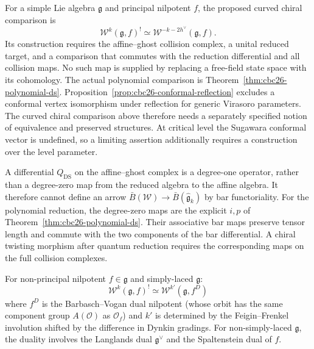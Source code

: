 

\begingroup
\providecommand{\Res}{\operatorname{Res}}
\providecommand{\Vir}{\operatorname{Vir}}
\providecommand{\Aut}{\operatorname{Aut}}

\endgroup




\begin{remark}
\label{thm:w-algebra-koszul-main}
\label{eq:w-koszul-main}\label{eq:ff-level-shift}
For a simple Lie algebra $\mathfrak g$ and principal nilpotent $f$, the proposed curved chiral comparison is
\[
 \mathcal W^k(\mathfrak g,f)^!\simeq\mathcal W^{-k-2h^\vee}(\mathfrak g,f).
\]
Its construction requires the affine--ghost collision complex, a unital reduced target, and a comparison that commutes with the reduction differential and all collision maps.
No such map is supplied by replacing a free-field state space with its cohomology.
The actual polynomial comparison is Theorem~\ref{thm:cbc26-polynomial-ds}.
Proposition~\ref{prop:cbc26-conformal-reflection} excludes a conformal vertex isomorphism under reflection for generic Virasoro parameters.
The curved chiral comparison above therefore needs a separately specified notion of equivalence and preserved structures.
At critical level the Sugawara conformal vector is undefined, so a limiting assertion additionally requires a construction over the level parameter.
\end{remark}

\begin{remark}
\label{rem:w-twisting-morphism}
A differential $Q_{\mathrm{DS}}$ on the affine--ghost complex is a degree-one operator, rather than a degree-zero map from the reduced algebra to the affine algebra.
It therefore cannot define an arrow $\bar B(\mathcal W)\to\bar B(\widehat{\mathfrak g}_k)$ by bar functoriality.
For the polynomial reduction, the degree-zero maps are the explicit $i,p$ of Theorem~\ref{thm:cbc26-polynomial-ds}.
Their associative bar maps preserve tensor length and commute with the two components of the bar differential.
A chiral twisting morphism after quantum reduction requires the corresponding maps on the full collision complexes.
\end{remark}

\begin{conjecture}\label{conj:w-orbit-duality}
For non-principal nilpotent $f \in \mathfrak{g}$ and simply-laced $\mathfrak{g}$:
\begin{equation}
\mathcal{W}^k(\mathfrak{g}, f)^! \simeq \mathcal{W}^{k'}(\mathfrak{g}, f^D)
\end{equation}
where $f^D$ is the Barbasch--Vogan dual nilpotent (whose orbit has the same component group $A(\mathcal{O})$ as $\mathcal{O}_f$) and $k'$ is determined by the Feigin--Frenkel involution shifted by the difference in Dynkin gradings.  For non-simply-laced $\mathfrak{g}$, the duality involves the Langlands dual $\mathfrak{g}^\vee$ and the Spaltenstein dual of $f$.
\end{conjecture}

